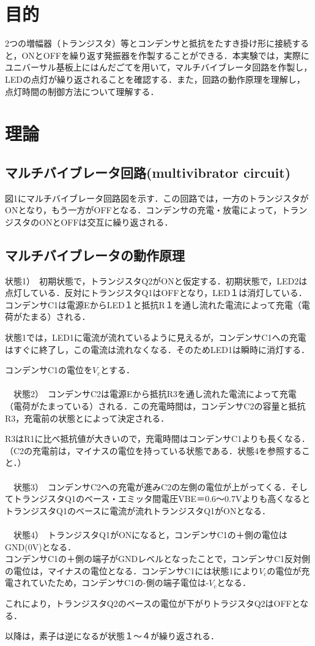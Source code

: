 \documentclass{ujarticle}
\begin{document}
\section{目的}
2つの増幅器（トランジスタ）等とコンデンサと抵抗をたすき掛け形に接続すると，ONとOFFを繰り返す発振器を作製することができる．本実験では，実際にユニバーサル基板上にはんだごてを用いて，マルチバイブレータ回路を作製し，LEDの点灯が繰り返されることを確認する．また，回路の動作原理を理解し，点灯時間の制御方法について理解する．

\section{理論}
\subsection{マルチバイブレータ回路(multivibrator circuit)}
図1にマルチバイブレータ回路図を示す．この回路では，一方のトランジスタがONとなり，もう一方がOFFとなる．コンデンサの充電・放電によって，トランジスタのONとOFFは交互に繰り返される．

\subsection{マルチバイブレータの動作原理}
状態1）　初期状態で，トランジスタQ2がONと仮定する．初期状態で，LED2は点灯している．反対にトランジスタQ1はOFFとなり，LED１は消灯している．コンデンサC1は電源EからLED１と抵抗R１を通し流れた電流によって充電（電荷がたまる）される．

状態1では，LED1に電流が流れているように見えるが，コンデンサC1への充電はすぐに終了し，この電流は流れなくなる．そのためLED1は瞬時に消灯する．

コンデンサC1の電位を$V_{c}$とする．\\
\\
　状態2）　コンデンサC2は電源Eから抵抗R3を通し流れた電流によって充電（電荷がたまっている）される．この充電時間は，コンデンサC2の容量と抵抗R3，充電前の状態とによって決定される．

R3はR1に比べ抵抗値が大きいので，充電時間はコンデンサC1よりも長くなる．（C2の充電前は，マイナスの電位を持っている状態である．状態4を参照すること．）\\
\\
　状態3）　コンデンサC2への充電が進みC2の左側の電位が上がってくる．そしてトランジスタQ1のベース・エミッタ間電圧VBE＝0.6～0.7Vよりも高くなるとトランジスタQ1のベースに電流が流れトランジスタQ1がONとなる．\\
\\
　状態4）　トランジスタQ1がONになると，コンデンサC1の＋側の電位はGND(0V)となる．
\\
コンデンサC1の＋側の端子がGNDレベルとなったことで，コンデンサC1反対側の電位は，マイナスの電位となる．コンデンサC1には状態1により$V_{c}$の電位が充電されていたため，コンデンサC1の-側の端子電位は-$V_{c}$となる．

これにより，トランジスタQ2のベースの電位が下がりトラジスタQ2はOFFとなる．

以降は，素子は逆になるが状態１～４が繰り返される．
\end{document}
